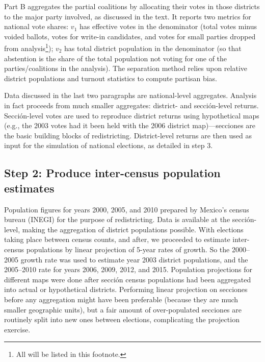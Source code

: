 \documentclass[letter,12pt]{article}
\begin{document}
Part B aggregates the partial coalitions by allocating their votes in those districts to the major party involved, as discussed in the text. It reports two metrics for national vote shares: $v_1$ has effective votes in the denominator (total votes minus voided ballots, votes for write-in candidates, and votes for small parties dropped from analysis\footnote{All will be listed in this footnote.}); $v_2$ has total district population in the denominator (so that abstention is the share of the total population not voting for one of the parties/coalitions in the analysis). The separation method relies upon relative district populations and turnout statistics to compute partisan bias.

Data discussed in the last two paragraphs are national-level aggregates. Analysis in fact proceeds from much smaller aggregates: district- and secci\'on-level returns. Secci\'on-level votes are used to reproduce district returns using hypothetical maps (e.g., the 2003 votes had it been held with the 2006 district map)---secciones are the basic building blocks of redistricting. District-level returns are then used as input for the simulation of national elections, as detailed in step 3.  

\subsection*{Step 2: Produce inter-census population estimates}

Population figures for years 2000, 2005, and 2010 prepared by Mexico's census bureau (INEGI) for the purpose of redistricting. Data is available at the secci\'on-level, making the aggregation of district populations possible. With elections taking place between census counts, and after, we proceeded to estimate inter-census populations by linear projection of 5-year rates of growth. So the 2000--2005 growth rate was used to estimate year 2003 district populations, and the 2005--2010 rate for years 2006, 2009, 2012, and 2015. Population projections for different maps were done after secci\'on census populations had been aggregated into actual or hypothetical districts. Performing linear projection on secciones before any aggregation might have been preferable (because they are much smaller geographic units), but a fair amount of over-populated secciones are routinely split into new ones between elections, complicating the projection exercise.
\end{document}
